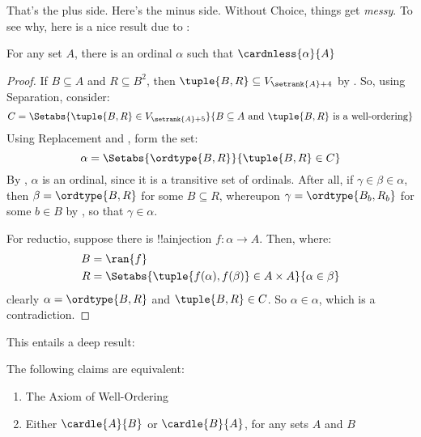 \documentclass[../../../include/open-logic-section]{subfiles}
\begin{document}
That's the plus side. Here's the minus side. Without Choice, things get \emph{messy}. To see why, here is a nice result due to \cite{Hartogs1915}:
\begin{lem}[\emph{in $\ZF$}]
	For any set $A$, there is an ordinal $\alpha$ such that $\cardnless{\alpha}{A}$
\end{lem}
\begin{proof}
	If $B \subseteq A$ and $R \subseteq B^2$, then $\tuple{B, R} \subseteq  V_{\setrank{A}+4}$ by . So, using Separation, consider:
		$$C = \Setabs{\tuple{B, R} \in V_{\setrank{A}+5}}{B\subseteq A \text{ and }\tuple{B, R}\text{ is a well-ordering}}$$
	 Using Replacement and , form the set: 
	 $$\alpha = \Setabs{\ordtype{B, R}}{\tuple{B, R} \in C}$$
	 By , $\alpha$ is an ordinal, since it is a transitive set of ordinals. After all, if $\gamma \in \beta \in \alpha$, then $\beta = \ordtype{B, R}$ for some $B \subseteq R$, whereupon $\gamma = \ordtype{B_b, R_b}$ for some $b \in B$ by , so that $\gamma \in \alpha$. 
	 
	 For reductio, suppose there is !!a{injection} $f \colon \alpha \to A$. Then, where:
	 \begin{align*}
	 	B&= \ran{f}\\
	 	R&= \Setabs{\tuple{f(\alpha), f(\beta)} \in A \times A}{\alpha \in \beta}
	 \end{align*}
	 clearly $\alpha = \ordtype{B, R}$ and $\tuple{B, R} \in C$. So $\alpha \in \alpha$, which is a contradiction.
\end{proof}\noindent
This entails a deep result:
\begin{thm}[\emph{in $\ZF$}]The following claims are equivalent:
	\begin{enumerate}
		\item{} The Axiom of Well-Ordering
		\item{} Either $\cardle{A}{B}$ or $\cardle{B}{A}$, for any sets $A$ and $B$
	\end{enumerate}
\end{thm}
\end{document}
